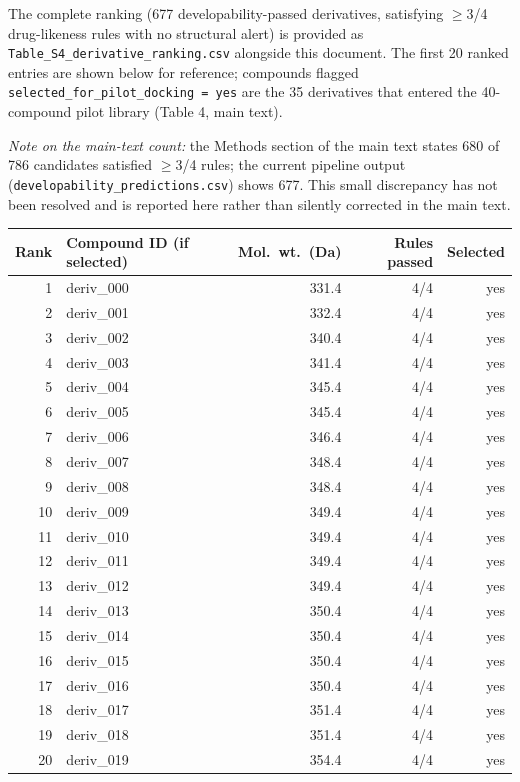 The complete ranking (677 developability-passed derivatives, satisfying $\ge$3/4 drug-likeness rules with no structural alert) is provided as \texttt{Table\_S4\_derivative\_ranking.csv} alongside this document. The first 20 ranked entries are shown below for reference; compounds flagged \texttt{selected\_for\_pilot\_docking = yes} are the 35 derivatives that entered the 40-compound pilot library (Table 4, main text).

\emph{Note on the main-text count:} the Methods section of the main text states 680 of 786 candidates satisfied $\ge$3/4 rules; the current pipeline output (\texttt{developability\_predictions.csv}) shows 677. This small discrepancy has not been resolved and is reported here rather than silently corrected in the main text.

\begin{center}
\footnotesize
\begin{tabular}{rlrrr}
\toprule
Rank & Compound ID (if selected) & Mol.\ wt.\ (Da) & Rules passed & Selected \\
\midrule
1 & deriv\_000 & 331.4 & 4/4 & yes \\
2 & deriv\_001 & 332.4 & 4/4 & yes \\
3 & deriv\_002 & 340.4 & 4/4 & yes \\
4 & deriv\_003 & 341.4 & 4/4 & yes \\
5 & deriv\_004 & 345.4 & 4/4 & yes \\
6 & deriv\_005 & 345.4 & 4/4 & yes \\
7 & deriv\_006 & 346.4 & 4/4 & yes \\
8 & deriv\_007 & 348.4 & 4/4 & yes \\
9 & deriv\_008 & 348.4 & 4/4 & yes \\
10 & deriv\_009 & 349.4 & 4/4 & yes \\
11 & deriv\_010 & 349.4 & 4/4 & yes \\
12 & deriv\_011 & 349.4 & 4/4 & yes \\
13 & deriv\_012 & 349.4 & 4/4 & yes \\
14 & deriv\_013 & 350.4 & 4/4 & yes \\
15 & deriv\_014 & 350.4 & 4/4 & yes \\
16 & deriv\_015 & 350.4 & 4/4 & yes \\
17 & deriv\_016 & 350.4 & 4/4 & yes \\
18 & deriv\_017 & 351.4 & 4/4 & yes \\
19 & deriv\_018 & 351.4 & 4/4 & yes \\
20 & deriv\_019 & 354.4 & 4/4 & yes \\
\bottomrule
\end{tabular}
\end{center}
